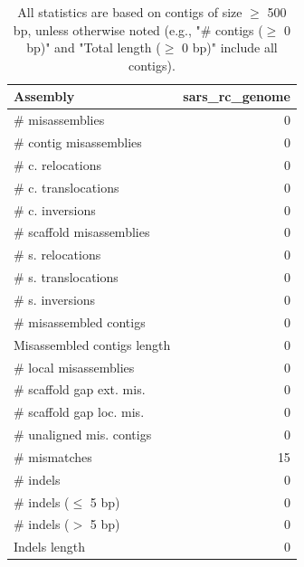 \documentclass[12pt,a4paper]{article}
\begin{document}
\begin{table}[ht]
\begin{center}
\caption{All statistics are based on contigs of size $\geq$ 500 bp, unless otherwise noted (e.g., "\# contigs ($\geq$ 0 bp)" and "Total length ($\geq$ 0 bp)" include all contigs).}
\begin{tabular}{|l*{1}{|r}|}
\hline
Assembly & sars\_rc\_genome \\ \hline
\# misassemblies & 0 \\ \hline
\hspace{2mm}\# contig misassemblies & 0 \\ \hline
\hspace{5mm}\# c. relocations & 0 \\ \hline
\hspace{5mm}\# c. translocations & 0 \\ \hline
\hspace{5mm}\# c. inversions & 0 \\ \hline
\hspace{2mm}\# scaffold misassemblies & 0 \\ \hline
\hspace{5mm}\# s. relocations & 0 \\ \hline
\hspace{5mm}\# s. translocations & 0 \\ \hline
\hspace{5mm}\# s. inversions & 0 \\ \hline
\# misassembled contigs & 0 \\ \hline
Misassembled contigs length & 0 \\ \hline
\# local misassemblies & 0 \\ \hline
\# scaffold gap ext. mis. & 0 \\ \hline
\# scaffold gap loc. mis. & 0 \\ \hline
\# unaligned mis. contigs & 0 \\ \hline
\# mismatches & 15 \\ \hline
\# indels & 0 \\ \hline
\hspace{5mm}\# indels ($\leq$ 5 bp) & 0 \\ \hline
\hspace{5mm}\# indels ($>$ 5 bp) & 0 \\ \hline
Indels length & 0 \\ \hline
\end{tabular}
\end{center}
\end{table}
\end{document}
